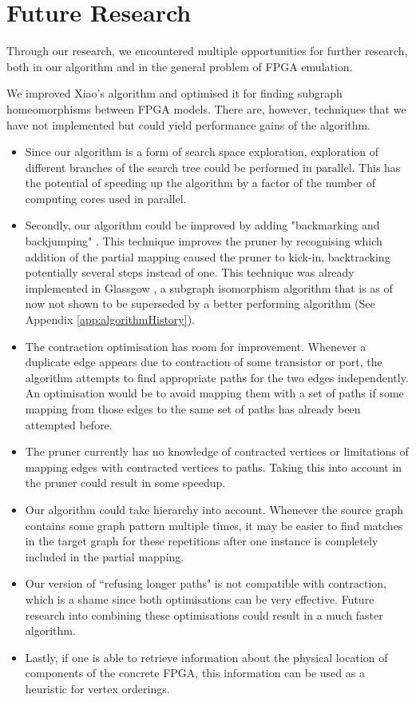 \chapter{Future Research}
Through our research, we encountered multiple opportunities for further research, both in our algorithm and in the general problem of FPGA emulation. 

We improved Xiao's algorithm and optimised it for finding subgraph homeomorphisms between FPGA models. There are, however, techniques that we have not implemented but could yield performance gains of the algorithm.
\begin{itemize}
\item Since our algorithm is a form of search space exploration, exploration of different branches of the search tree could be performed in parallel. This has the potential of speeding up the algorithm by a factor of the number of computing cores used in parallel.
\item Secondly, our algorithm could be improved by adding "backmarking and backjumping" \cite{KONDRAK1997365}. This technique improves the pruner by recognising which addition of the partial mapping caused the pruner to kick-in, backtracking potentially several steps instead of one. This technique was already implemented in Glassgow \cite{McCreesh2015}, a subgraph isomorphism algorithm that is as of now not shown to be superseded by a better performing algorithm (See Appendix \ref{app:algorithmHistory}).
\item The contraction optimisation has room for improvement. Whenever a duplicate edge appears due to contraction of some transistor or port, the algorithm attempts to find appropriate paths for the two edges independently. An optimisation would be to avoid mapping them with a set of paths if some mapping from those edges to the same set of paths has already been attempted before.
\item The pruner currently has no knowledge of contracted vertices or limitations of mapping edges with contracted vertices to paths. Taking this into account in the pruner could result in some speedup.
\item Our algorithm could take hierarchy into account. Whenever the source graph contains some graph pattern multiple times, it may be easier to find matches in the target graph for these repetitions after one instance is completely included in the partial mapping.
\item Our version of ``refusing longer paths" is not compatible with contraction, which is a shame since both optimisations can be very effective. Future research into combining these optimisations could result in a much faster algorithm.
\item Lastly, if one is able to retrieve information about the physical location of components of the concrete FPGA, this information can be used as a heuristic for vertex orderings.
\end{itemize}

